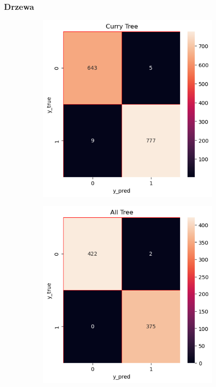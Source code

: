 \documentclass{beamer}
\begin{document}
\begin{frame}
	\frametitle{Drzewa}
	\begin{figure}
		\begin{subfigure}[b]{0.45\textwidth}
			\includegraphics[width=\linewidth, height=0.45\textheight]{E_Tree1.png}
		\end{subfigure}
		\begin{subfigure}[b]{0.45\textwidth}
			\includegraphics[width=\linewidth, height=0.45\textheight]{E_Tree_all.png}
		\end{subfigure}
		

\end{figure}
\end{frame}
\end{document}
